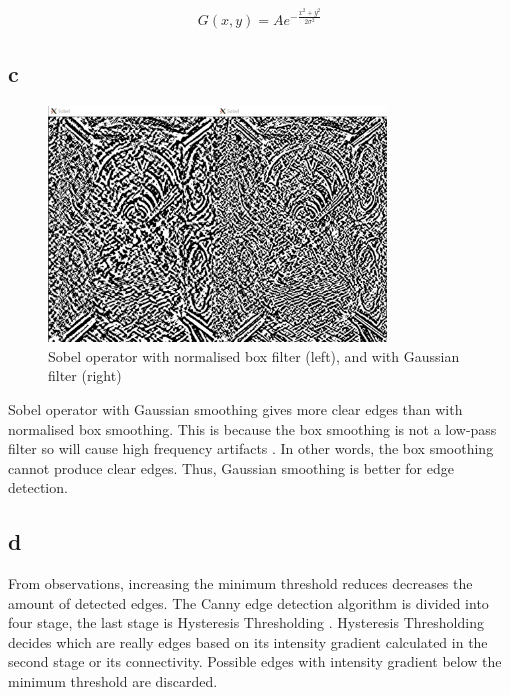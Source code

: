 \begin{equation*}
    G(x,y) = Ae^{-\frac{x^2+y^2}{2\sigma^2}}
\end{equation*}



\subsection{c}
\begin{figure}[htbp]
   \centering
   \includegraphics[width=0.8\textwidth]{assets/images/figures/Sobel_with_normalised_box_or_Gaussian.png}
   \caption{Sobel operator with normalised box filter (left), and with Gaussian filter (right)}
   \label{fig:Sobel_with_normalised_box_VS_with_Gaussian}
\end{figure}

Sobel operator with Gaussian smoothing gives more clear edges than with normalised box smoothing. This is because the box smoothing is not a low-pass filter so will cause high frequency artifacts \cite{ref:boxvsgaussian}. In other words, the box smoothing cannot produce clear edges. Thus, Gaussian smoothing is better for edge detection.



\subsection{d}
From observations, increasing the minimum threshold reduces decreases the amount of detected edges. The Canny edge detection algorithm is divided into four stage, the last stage is Hysteresis Thresholding \cite{ref:canny_ttl}. Hysteresis Thresholding decides which are really edges based on its intensity gradient calculated in the second stage or its connectivity. Possible edges with intensity gradient below the minimum threshold are discarded.

